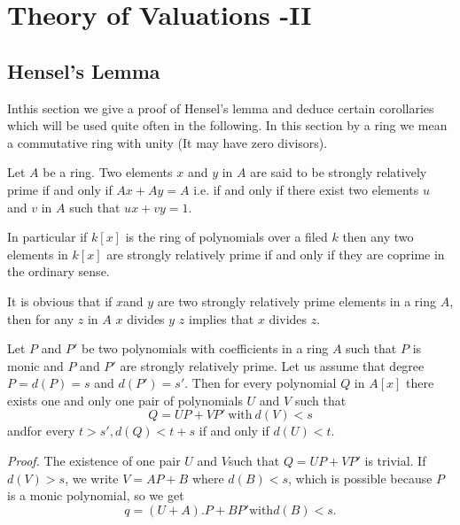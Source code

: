 \chapter{Theory of Valuations -II}\label{part1:chap2}

\section{Hensel's Lemma}\label{part1:chap2:sec1}

In\pageoriginale this section we give a proof of Hensel's lemma and deduce certain
corollaries which will be used quite often in the following. In this
section by a ring we mean a commutative ring with unity (It may have
zero divisors). 

\begin{defi*}%
  Let $A$ be a ring. Two elements $x$ and $y$ in $A$ are said to be
  strongly relatively prime if and only if $Ax + Ay =A$ i.e. if and
  only if there exist two elements $u$ and $v$ in $A$ such that $ux+
  vy =1$.  
\end{defi*} 
 
In particular if $k[x]$ is the ring of polynomials over a filed $k$
then any two elements in $k[x]$ are strongly relatively prime if and
only if they are coprime in the ordinary sense. 
 
It is obvious that if $x$and $y$ are two strongly relatively prime
elements in a ring $A$, then for any $z$ in $A$ $x$ divides $y$ $z$
implies that $x$ divides $z$. 

\setcounter{Lemma}{0}
\begin{Lemma}\label{part1:chap2:sec1:lem1}%
  Let $P$ and $P'$ be two polynomials with coefficients in a ring $A$
  such that $P$ is monic and $P$ and $P'$ are strongly relatively
  prime. Let us assume that degree $P= d(P)=s$ and $d (P')=s'$. Then
  for every polynomial $Q$ in $A[x]$ there exists one and only one
  pair of polynomials $U$ and $V$ such that  
  $$
  Q=U P + V P' ~\text{with}~ d(V) < s 
  $$
  and\pageoriginale for every $t> s', d(Q)< t + s$ if and only if $d(U) <t$.
\end{Lemma}

\noindent \textit{Proof.}  
  The existence of one pair $U$ and $V$such that $Q=UP+V P'$ is
  trivial. If $d(V) >s$, we write $V=AP +B$ where $d(B)<s$, which is
  possible because $P$ is a monic polynomial, so we get  
  \begin{equation*}
  q = (U+A). P+B P' \text{with} d(B) <s.\tag*{$\Box$}
  \end{equation*}

